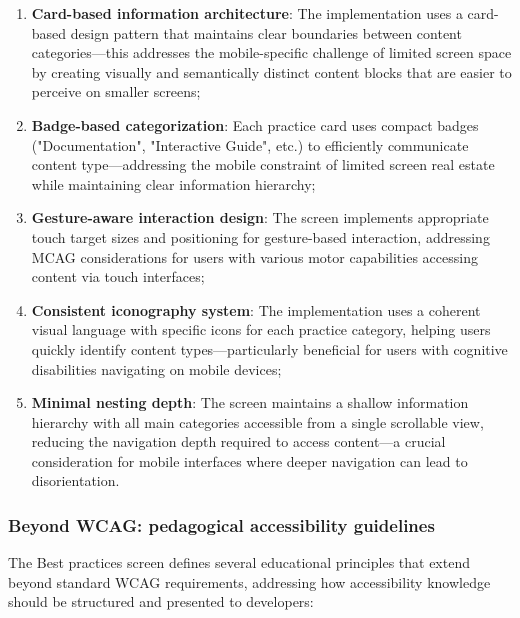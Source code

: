 \begin{enumerate}
    \item \textbf{Card-based information architecture}: The implementation uses a card-based design pattern that maintains clear boundaries between content categories—this addresses the mobile-specific challenge of limited screen space by creating visually and semantically distinct content blocks that are easier to perceive on smaller screens;
    
    \item \textbf{Badge-based categorization}: Each practice card uses compact badges ("Documentation", "Interactive Guide", etc.) to efficiently communicate content type—addressing the mobile constraint of limited screen real estate while maintaining clear information hierarchy;
    
    \item \textbf{Gesture-aware interaction design}: The screen implements appropriate touch target sizes and positioning for gesture-based interaction, addressing MCAG considerations for users with various motor capabilities accessing content via touch interfaces;
    
    \item \textbf{Consistent iconography system}: The implementation uses a coherent visual language with specific icons for each practice category, helping users quickly identify content types—particularly beneficial for users with cognitive disabilities navigating on mobile devices;
    
    \item \textbf{Minimal nesting depth}: The screen maintains a shallow information hierarchy with all main categories accessible from a single scrollable view, reducing the navigation depth required to access content—a crucial consideration for mobile interfaces where deeper navigation can lead to disorientation.
\end{enumerate}

\subsubsection{Beyond WCAG: pedagogical accessibility guidelines}

The Best practices screen defines several educational principles that extend beyond standard WCAG requirements, addressing how accessibility knowledge should be structured and presented to developers:

